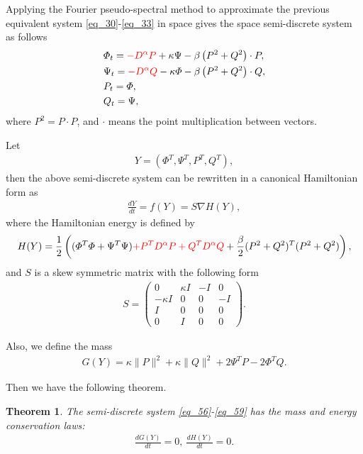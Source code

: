 \documentclass[preprint,compress,3p,10pt,fleqn]{elsarticle}
\numberwithin{equation}{section}
\newtheorem{theorem}{Theorem}[section]
\begin{document}
Applying the Fourier pseudo-spectral method to approximate the previous equivalent system \eqref{eq_30}-\eqref{eq_33} in space gives the space semi-discrete system as follows
\begin{align}
&\varPhi_{t}=\textcolor[rgb]{1.00,0.00,0.00}{-D^{\alpha}P}+\kappa \Psi-\beta \left( P^{2}+Q^{2}\right)\cdot P,\label{eq_56}\\
&\Psi_{t}=\textcolor[rgb]{1.00,0.00,0.00}{-D^{\alpha}Q}-\kappa \varPhi-\beta \left( P^{2}+Q^{2}\right)\cdot Q,\label{eq_57}\\
&P_t=\varPhi,\label{eq_58}\\
&Q_t=\Psi,\label{eq_59}
\end{align}
where $P^{2}=P \cdot P$, and $\cdot$ means the point multiplication between vectors.

Let
\begin{align}\label{eq_60a}
Y=\left(\varPhi^{T}, \Psi^{T}, P^{T}, Q^{T}\right),
\end{align}
then the above semi-discrete system can be rewritten in a canonical Hamiltonian form as
\begin{align}\label{eq_60}
\frac{d Y}{d t}=f(Y)=S \nabla H(Y),
\end{align}
where the Hamiltonian energy is defined by
\begin{align}\label{eq_61}
	H(Y)=\frac{1}{2}\left((\varPhi^{T}\varPhi+\Psi^{T}\Psi)\textcolor[rgb]{1.00,0.00,0.00}{+P^{T} D^{\alpha} P+Q^{T} D^{\alpha} Q}+\frac{\beta}{2}(P^2+Q^2)^{T}(P^2+Q^2)\right),
\end{align}
and $S$ is a skew symmetric matrix with the following form
\begin{align}\label{eq_62}
S=\left(\begin{array}{cccc}
0 & \kappa I & -I & 0 \\
-\kappa I & 0 & 0 & -I \\
I & 0 & 0 & 0 \\
0 & I & 0 & 0
\end{array}\right).
\end{align}

Also, we define the mass
\begin{align}\label{eq_63}
G(Y)=\kappa\|P\|^{2}+\kappa\|Q\|^{2} +2\Psi^{T}P-2\varPhi^{T}Q.
\end{align}

Then we have the following theorem.
\begin{theorem}	\label{thm3}
	The semi-discrete system \eqref{eq_56}-\eqref{eq_59} has the mass and energy conservation laws:
\begin{align}
\frac{d G(Y)}{d t}=0,~\frac{d H(Y)}{d t}=0.
\end{align}
\end{theorem}
\end{document}
